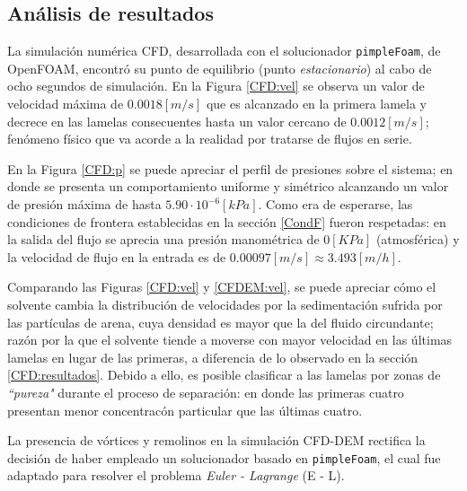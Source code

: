\begin{center}
	\section{An\'alisis de resultados}
\end{center}

\noindent
\justify

La simulaci\'on num\'erica CFD, desarrollada con el solucionador \texttt{pimpleFoam}, de OpenFOAM, encontr\'o su punto de equilibrio (punto \textit{estacionario}) al cabo de ocho segundos de simulaci\'on. En la Figura \ref{CFD:vel} se observa un valor de velocidad m\'axima de $0.0018 [m/s]$ que es alcanzado en la primera lamela y decrece en las lamelas consecuentes hasta un valor cercano de $0.0012 [m/s]$; fen\'omeno f\'isico que va acorde a la realidad por tratarse de flujos en serie.

\noindent
\justify

En la Figura \ref{CFD:p} se puede apreciar el perfil de presiones sobre el sistema; en donde se presenta un comportamiento uniforme y sim\'etrico alcanzando un valor de presi\'on m\'axima de hasta $5.90 \cdot 10^{-6} [kPa]$. Como era de esperarse, las condiciones de frontera establecidas en la secci\'on \ref{CondF} fueron respetadas: en la salida del flujo se aprecia una presi\'on manom\'etrica de $0 [KPa]$ (atmosf\'erica) y la velocidad de flujo en la entrada es de $0.00097 [m/s] \approx 3.493 [m/h]$.

\noindent
\justify

Comparando las Figuras \ref{CFD:vel} y \ref{CFDEM:vel}, se puede apreciar c\'omo el solvente cambia la distribuci\'on de velocidades por la sedimentaci\'on sufrida por las part\'iculas de arena, cuya densidad es mayor que la del fluido circundante; raz\'on por la que el solvente tiende a moverse con mayor velocidad en las \'ultimas lamelas en lugar de las primeras, a diferencia de lo observado en la secci\'on \ref{CFD:resultados}. Debido a ello, es posible clasificar a las lamelas por zonas de \textit{``pureza"} durante el proceso de separaci\'on: en donde las primeras cuatro presentan menor concentrac\'on particular que las \'ultimas cuatro.

\noindent
\justify

La presencia de v\'ortices y remolinos en la simulaci\'on CFD-DEM rectifica la decisi\'on de haber empleado un solucionador basado en \texttt{pimpleFoam}, el cual fue adaptado para resolver el problema \textit{Euler - Lagrange} (E - L).

